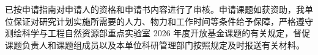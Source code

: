 已按申请指南对申请人的资格和申请书内容进行了审核。申请课题如获资助，我单位保证对研究计划实施所需要的人力、物力和工作时间等条件给予保障，严格遵守测绘科学与工程自然资源部重点实验室 2026 年度开放基金课题的有关规定，督促课题负责人和课题组成员以及本单位科研管理部门按照规定及时报送有关材料。
